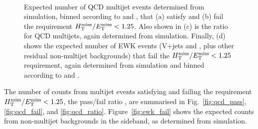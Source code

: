 \begin{figure}[!h]
{   %
  } \\
  \caption{Expected number of QCD multijet events determined from
    simulation, binned according to \njet and \scalht, that (a) satisfy
    and (b) fail the requirement $\mbox{$\mbox{$H_{\rm T}^{\rm miss}$} / \mbox{$E_\text{T}^{\rm miss}$}$} < 1.25$. Also shown in (c)
    is the ratio \rmhtmet for QCD multijets, again determined from
    simulation. Finally, (d) shows the expected number of EWK events
    (V+jets and \ttbar, plus other residual non-multijet backgrounds)
    that fail the $\mbox{$\mbox{$H_{\rm T}^{\rm miss}$} / \mbox{$E_\text{T}^{\rm miss}$}$} < 1.25$ requirement, again determined from
    simulation and binned according to \njet and \scalht.}
  \label{fig:qcd_plots}
\end{figure}

The number of counts from multijet events satisfying and failing the
requirement $\mbox{$\mbox{$H_{\rm T}^{\rm miss}$} / \mbox{$E_\text{T}^{\rm miss}$}$} < 1.25$, \ie the pass/fail ratio \rmhtmet, are summarised in Fig.~\ref{fig:qcd_pass},
\ref{fig:qcd_fail}, and \ref{fig:qcd_ratio}. Figure~\ref{fig:ewk_fail}
shows the expected counts from non-multijet backgrounds in the \mhtmet
sideband, as determined from simulation.

